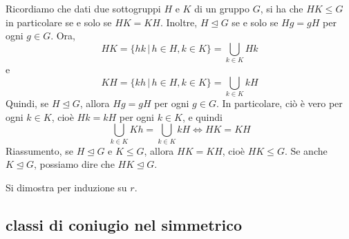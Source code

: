 \documentclass[a4paper]{article}
\begin{document}
Ricordiamo che dati due sottogruppi \(H\) e \(K\) di un gruppo \(G\),
si ha che \(HK \leq G\) in particolare se e solo se
\(HK = KH\). Inoltre, \(H \unlhd G\) se e solo se \(Hg = gH\)
per ogni \(g\in G\).
Ora,
\[
    HK = \{hk \,|\, h\in H, k\in K\} = \bigcup_{k\in K} Hk
\]
e
\[
    KH = \{kh \,|\, h\in H, k\in K\} = \bigcup_{k\in K} kH
\]
Quindi, se \(H \unlhd G\), allora \(Hg = gH\)
per ogni \(g \in G\). In particolare,
ciò è vero per ogni \(k \in K\), cioè \(Hk = kH\)
per ogni \(k\in K\), e quindi
\[
    \bigcup_{k\in K} Kh = \bigcup_{k\in K} kH \iff HK = KH
\]
Riassumento, se \(H \unlhd G\) e \(K \leq G\), allora
\(HK = KH\), cioè \(HK \leq G\).
Se anche \(K \unlhd G\), possiamo dire che
\(HK \unlhd G\).




Si dimostra per induzione su \(r\).

\subsection{classi di coniugio nel simmetrico}

\end{document}
